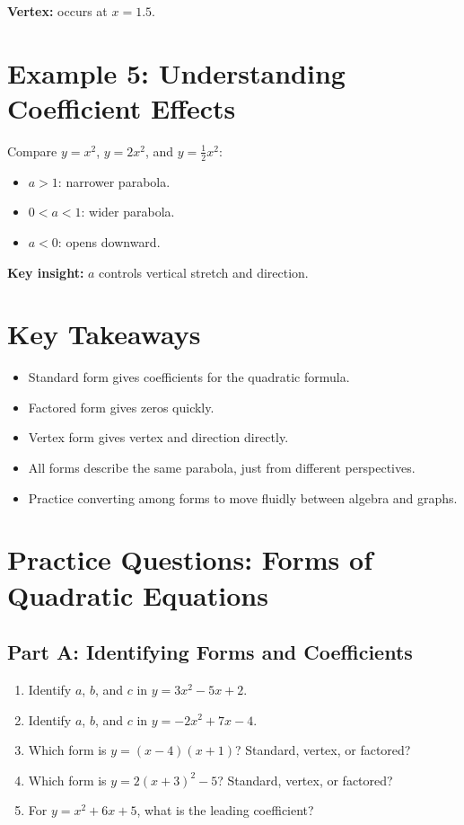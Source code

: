 \documentclass[14pt]{extarticle}
\begin{document}
\textbf{Vertex:} occurs at \(x = 1.5\).

\section*{Example 5: Understanding Coefficient Effects}

Compare \(y = x^2\), \(y = 2x^2\), and \(y = \frac{1}{2}x^2\):
\begin{itemize}
  \item \(a > 1\): narrower parabola.
  \item \(0 < a < 1\): wider parabola.
  \item \(a < 0\): opens downward.
\end{itemize}

\textbf{Key insight:} \(a\) controls vertical stretch and direction.

\section*{Key Takeaways}
\begin{itemize}
  \item Standard form gives coefficients for the quadratic formula.
  \item Factored form gives zeros quickly.
  \item Vertex form gives vertex and direction directly.
  \item All forms describe the same parabola, just from different perspectives.
  \item Practice converting among forms to move fluidly between algebra and graphs.
\end{itemize}

\newpage


\section*{Practice Questions: Forms of Quadratic Equations}

\subsection*{Part A: Identifying Forms and Coefficients}
\begin{enumerate}
  \item Identify \(a\), \(b\), and \(c\) in \(y = 3x^2 - 5x + 2.\)
  \item Identify \(a\), \(b\), and \(c\) in \(y = -2x^2 + 7x - 4.\)
  \item Which form is \(y = (x - 4)(x + 1)\)? Standard, vertex, or factored?
  \item Which form is \(y = 2(x + 3)^2 - 5\)? Standard, vertex, or factored?
  \item For \(y = x^2 + 6x + 5\), what is the leading coefficient?
\end{enumerate}
\end{document}
